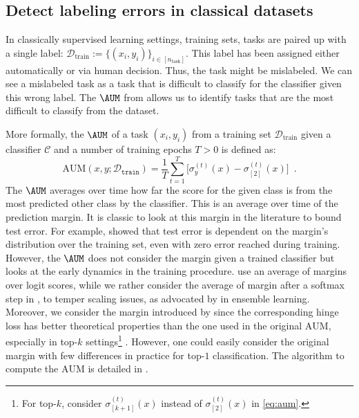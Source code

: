 \subsection{Detect labeling errors in classical datasets}
In classically supervised learning settings, training sets, tasks are paired up with a single label: $\mathcal{D}_\text{train}:=\{(x_i,y_i)\}_{i\in [n_\text{task}]}$.
This label has been assigned either automatically or via human decision.
Thus, the task might be mislabeled.
We can see a mislabeled task as a task that is difficult to classify for the classifier given this wrong label.
The $\AUM$ from \citet{pleiss_identifying_2020} allows us to identify tasks that are the most difficult to classify from the dataset.

More formally, the $\AUM$ of a task $(x_i,y_i)$ from a training set $\mathcal{D}_\text{train}$ given a classifier $\mathcal{C}$ and a number of training epochs $T>0$ is defined as:
\begin{equation}\label{eq:aum}
    \mathrm{AUM}\left(x, y; \mathcal{D}_{\texttt{train}}\right)
    = \!\! \frac{1}{T}\sum_{t=1}^T \!\! \big[\sigma^{(t)}_{y} (x)- \sigma^{(t)}_{[2]}(x)\big]
    \enspace.
\end{equation}
The $\AUM$ averages over time how far the score for the given class is from the most predicted other class by the classifier.
This is an average over time of the prediction margin.
It is classic to look at this margin in the literature to bound test error.
For example, \citet{bartlett1998boosting} showed that test error is dependent on the margin's distribution over the training set, even with zero error reached during training.
However, the $\AUM$ does not consider the margin given a trained classifier but looks at the early dynamics in the training procedure.
\citet{pleiss_identifying_2020} use an average of margins over logit scores, while we rather consider the average of margin after a softmax step in ,
to temper scaling issues, as advocated by \citet{ju2018relative} in ensemble learning.
Moreover, we consider the margin introduced by \citet{yang2020consistency} since the corresponding hinge loss has better theoretical properties than the one used in the original $\mathrm{AUM}$, especially in top-$k$ settings\footnote{For top-$k$, consider $\sigma^{(t)}_{[k+1]}(x)$ instead of $\sigma^{(t)}_{[2]}(x)$ in \eqref{eq:aum}.} \citep{lapin2016loss, yang2020consistency,Garcin_Servajean_Joly_Salmon22}. However, one could easily consider the original margin with few differences in practice for top-$1$ classification. The algorithm to compute the $\mathrm{AUM}$ is detailed in .

